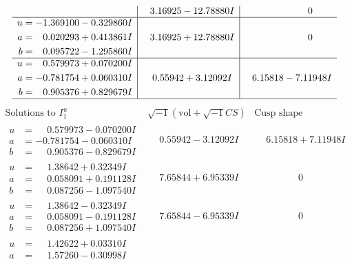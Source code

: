 \documentclass[1p]{elsarticle_modified}
\theoremstyle{definition}
\newcommand{\I}{\sqrt{-1}}
\begin{document}
$$\begin{array}{c|c|c}
 & \phantom{-}3.16925 - 12.78880 I & \phantom{-0.000000 } 0 \\ \hline\begin{aligned}
u &= -1.369100 - 0.329860 I \\
a &= \phantom{-}0.020293 + 0.413861 I \\
b &= \phantom{-}0.095722 - 1.295860 I\end{aligned}
 & \phantom{-}3.16925 + 12.78880 I & \phantom{-0.000000 } 0 \\ \hline\begin{aligned}
u &= \phantom{-}0.579973 + 0.070200 I \\
a &= -0.781754 + 0.060310 I \\
b &= \phantom{-}0.905376 + 0.829679 I\end{aligned}
 & \phantom{-}0.55942 + 3.12092 I & \phantom{-}6.15818 - 7.11948 I\\
 \hline 
 \end{array}$$\newpage$$\begin{array}{c|c|c}  
\text{Solutions to }I^u_{1}& \I (\text{vol} + \sqrt{-1}CS) & \text{Cusp shape}\\
 \hline 
\begin{aligned}
u &= \phantom{-}0.579973 - 0.070200 I \\
a &= -0.781754 - 0.060310 I \\
b &= \phantom{-}0.905376 - 0.829679 I\end{aligned}
 & \phantom{-}0.55942 - 3.12092 I & \phantom{-}6.15818 + 7.11948 I \\ \hline\begin{aligned}
u &= \phantom{-}1.38642 + 0.32349 I \\
a &= \phantom{-}0.058091 + 0.191128 I \\
b &= \phantom{-}0.087256 - 1.097540 I\end{aligned}
 & \phantom{-}7.65844 + 6.95339 I & \phantom{-0.000000 } 0 \\ \hline\begin{aligned}
u &= \phantom{-}1.38642 - 0.32349 I \\
a &= \phantom{-}0.058091 - 0.191128 I \\
b &= \phantom{-}0.087256 + 1.097540 I\end{aligned}
 & \phantom{-}7.65844 - 6.95339 I & \phantom{-0.000000 } 0 \\ \hline\begin{aligned}
u &= \phantom{-}1.42622 + 0.03310 I \\
a &= \phantom{-}1.57260 - 0.30998 I \\

\end{aligned}
\end{array}$$
\end{document}
